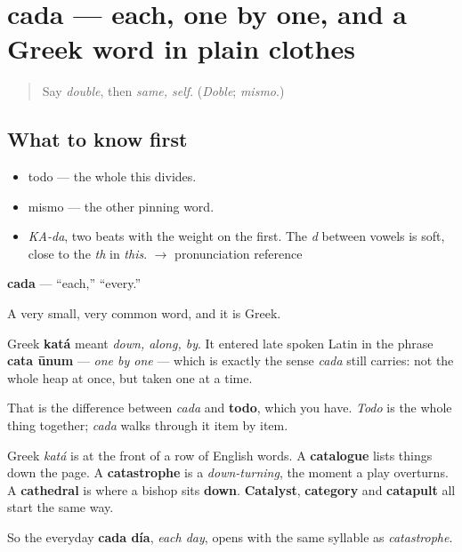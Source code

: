 \section[cada]{cada — each, one by one, and a Greek word in plain clothes}

\label{lesson:ES-C345-cada}



\begin{quote}
Say \emph{double}, then \emph{same, self}. (\emph{Doble}; \emph{mismo}.)
\end{quote}

\subsection*{What to know first}
\begin{itemize}
\raggedright
  \item todo — the whole this divides.
  \item mismo — the other pinning word.
\end{itemize}

\begin{sounds}
\begin{itemize}
\raggedright
  \item \emph{KA-da}, two beats with the weight on the first. The \emph{d} between vowels is soft, close to the \emph{th} in \emph{this}. $\to$ pronunciation reference
\end{itemize}
\end{sounds}

\begin{cousinweb}
\textbf{cada} — \textquotedblleft{}each,\textquotedblright{} \textquotedblleft{}every.\textquotedblright{}

A very small, very common word, and it is Greek.

Greek \textbf{katá} meant \emph{down, along, by}. It entered late spoken Latin in the phrase \textbf{cata ūnum} — \emph{one by one} — which is exactly the sense \emph{cada} still carries: not the whole heap at once, but taken one at a time.

That is the difference between \emph{cada} and \textbf{todo}, which you have. \emph{Todo} is the whole thing together; \emph{cada} walks through it item by item.

Greek \emph{katá} is at the front of a row of English words. A \textbf{catalogue} lists things down the page. A \textbf{catastrophe} is a \emph{down-turning}, the moment a play overturns. A \textbf{cathedral} is where a bishop sits \textbf{down}. \textbf{Catalyst}, \textbf{category} and \textbf{catapult} all start the same way.

So the everyday \textbf{cada día}, \emph{each day}, opens with the same syllable as \emph{catastrophe}.
\end{cousinweb}


